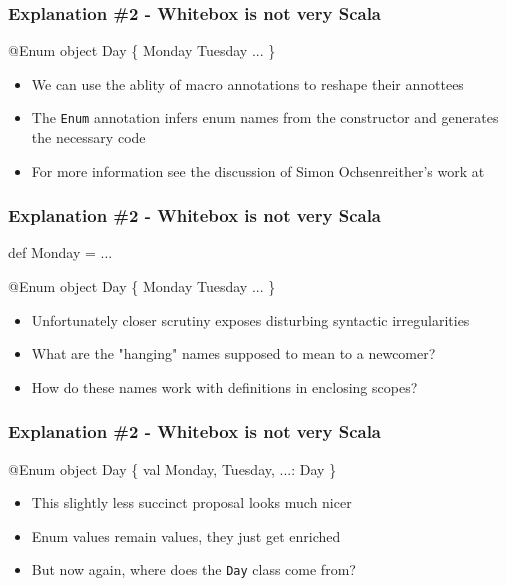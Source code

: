 \documentclass[svgnames,hyperref={bookmarks=false}]{beamer}
\begin{document}
\begin{frame}[fragile]
\frametitle{Explanation \#2 - Whitebox is not very Scala}

\begin{semiverbatim}
\alert{@Enum}
object Day \{
  Monday
  Tuesday
  ...
\}

\end{semiverbatim}

\begin{itemize}
\item We can use the ablity of macro annotations to reshape their annottees
\item The \texttt{Enum} annotation infers enum names from the constructor and generates the necessary code
\item For more information see the discussion of Simon Ochsenreither's work at 
\end{itemize}
\end{frame}

\begin{frame}[fragile]
\frametitle{Explanation \#2 - Whitebox is not very Scala}

\begin{semiverbatim}
def Monday = ...

\alert{@Enum}
object Day \{
  Monday
  Tuesday
  ...
\}

\end{semiverbatim}

\begin{itemize}
\item Unfortunately closer scrutiny exposes disturbing syntactic irregularities
\item What are the "hanging" names supposed to mean to a newcomer?
\item How do these names work with definitions in enclosing scopes?
\end{itemize}
\end{frame}

\begin{frame}[fragile]
\frametitle{Explanation \#2 - Whitebox is not very Scala}

\begin{semiverbatim}
\alert{@Enum}
object Day \{
  val Monday, Tuesday, ...: Day
\}

\end{semiverbatim}

\begin{itemize}
\item This slightly less succinct proposal looks much nicer
\item Enum values remain values, they just get enriched
\item But now again, where does the \texttt{Day} class come from?
\end{itemize}
\end{frame}
\end{document}
